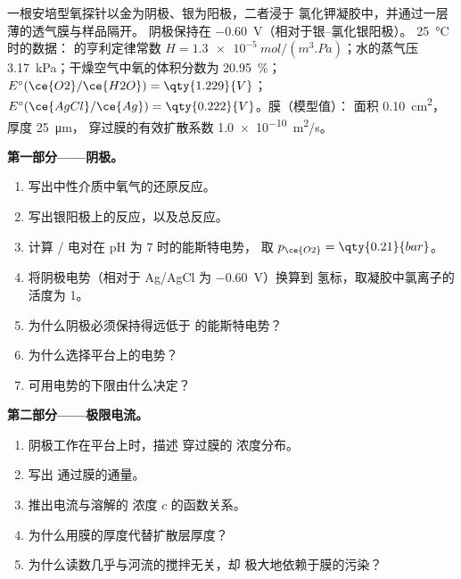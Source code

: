 \begin{problem}
\label{pb:b2:current-potential-curves:1}
一根安培型氧探针以金为阴极、银为阳极，二者浸于
氯化钾凝胶中，并通过一层薄的透气膜与样品隔开。
阴极保持在 \qty{-0.60}{V}（相对于银–氯化银阳极）。
\qty{25}{\degreeCelsius} 时的数据： 的亨利定律常数
$H = \qty{1.3e-5}{mol/(m^3.Pa)}$；水的蒸气压
\qty{3.17}{kPa}；干燥空气中氧的体积分数为 20.95~\%；$E^\circ(\ce{O2}/\ce{H2O}) =
\qty{1.229}{V}$；$E^\circ(\ce{AgCl}/\ce{Ag}) = \qty{0.222}{V}$。膜（模型值）：
面积 \qty{0.10}{cm^2}，厚度 \qty{25}{\micro m}，
 穿过膜的有效扩散系数 \qty{1.0e-10}{m^2/s}。

\medskip
\noindent\textbf{第一部分——阴极。}
\begin{enumerate}
  \item 写出中性介质中氧气的还原反应。
  \item 写出银阳极上的反应，以及总反应。
  \item 计算 / 电对在 pH 为 7 时的能斯特电势，
        取 $p_{\ce{O2}} = \qty{0.21}{bar}$。
  \item 将阴极电势（相对于 Ag/AgCl 为 \qty{-0.60}{V}）换算到
        氢标，取凝胶中氯离子的活度为 1。
  \item 为什么阴极必须保持得远低于
         的能斯特电势？
  \item 为什么选择平台上的电势？
  \item 可用电势的下限由什么决定？
\end{enumerate}

\medskip
\noindent\textbf{第二部分——极限电流。}
\begin{enumerate}[resume]
  \item 阴极工作在平台上时，描述  穿过膜的
        浓度分布。
  \item 写出  通过膜的通量。
  \item 推出电流与溶解的
         浓度 $c$ 的函数关系。
  \item 为什么用膜的厚度代替扩散层厚度？
  \item 为什么读数几乎与河流的搅拌无关，却
        极大地依赖于膜的污染？
\end{enumerate}


\end{problem}
